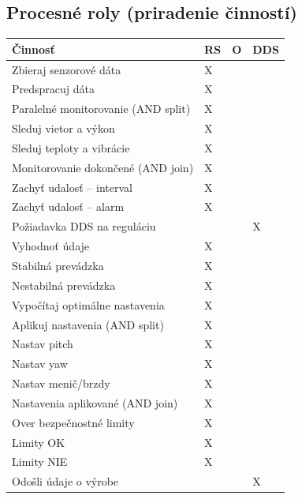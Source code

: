 \documentclass[12pt,a4paper]{article}
\begin{document}
\subsection{Procesné roly (priradenie činností)}
\begin{table}[H]
  \centering
  \small
  \renewcommand{\arraystretch}{1.2}
  \begin{tabularx}{\textwidth}{|X|p{}|p{}|p{}|}
    \hline
    \textbf{Činnosť} & \textbf{RS} & \textbf{O} & \textbf{DDS} \\
    \hline
    Zbieraj senzorové dáta & X & & \\
    \hline
    Predspracuj dáta & X & & \\
    \hline
    Paralelné monitorovanie (AND split) & X & & \\
    \hline
    Sleduj vietor a výkon & X & & \\
    \hline
    Sleduj teploty a vibrácie & X & & \\
    \hline
    Monitorovanie dokončené (AND join) & X & & \\
    \hline
    Zachyť udalosť -- interval & X & & \\
    \hline
    Zachyť udalosť -- alarm & X & & \\
    \hline
    Požiadavka DDS na reguláciu & & & X \\
    \hline
    Vyhodnoť údaje & X & & \\
    \hline
    Stabilná prevádzka & X & & \\
    \hline
    Nestabilná prevádzka & X & & \\
    \hline
    Vypočítaj optimálne nastavenia & X & & \\
    \hline
    Aplikuj nastavenia (AND split) & X & & \\
    \hline
    Nastav pitch & X & & \\
    \hline
    Nastav yaw & X & & \\
    \hline
    Nastav menič/brzdy & X & & \\
    \hline
    Nastavenia aplikované (AND join) & X & & \\
    \hline
    Over bezpečnostné limity & X & & \\
    \hline
    Limity OK & X & & \\
    \hline
    Limity NIE & X & & \\
    \hline
    Odošli údaje o výrobe & & & X \\

\end{tabularx}
\end{table}
\end{document}
